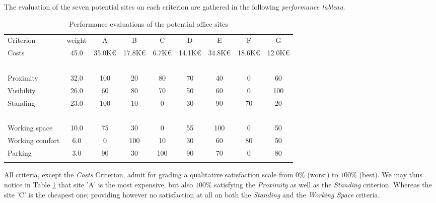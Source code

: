 The evaluation of the seven potential sites on each criterion are gathered in the following \emph{performance tableau}.
\begin{table}[h]
\caption{Performance evaluations of the potential office sites}
\label{tab:6.3}       %
\begin{center}
    \begin{tabular}{l|c|c|c|c|c|c|c|c}
      \svhline\noalign{\smallskip}
    Criterion  &   weight &  A  &      B &       C &       D &       E &        F &        G\\
       \noalign{\smallskip}\hline\noalign{\smallskip}

    Costs     &    45.0  &   35.0K€ &  17.8K€  & 6.7K€  &  14.1K€ &  34.8K€ &  18.6K€ &  12.0K€\\
    \      &        \    &   \      &  \     &   \     &   \    &    \    &    \    &    \ \\
    Proximity     &     32.0  &   100    &  20 &      80    &   70    &   40    &   0    &    60 \\
    Visibility     &     26.0  &   60     &  80  &     70    &   50    &   60    &   0    &    100 \\
    Standing     &     23.0  &   100   &   10   &    0     &   30    &   90    &   70   &    20 \\
    \        &      \    &   \     &   \    &    \     &   \     &   \     &   \    &    \  \\
    Working space     &     10.0  &   75    &   30   &    0     &   55    &   100   &   0    &    50  \\
    Working comfort     &      6.0  &   0     &   100  &    10    &   30    &   60    &   80   &    50 \\
    Parking     &      3.0  &   90    &   30   &    100   &   90    &   70    &   0    &    80 \\
      \noalign{\smallskip}\hline
    \end{tabular}
  \end{center}
\end{table}

All criteria, except the \emph{Costs} Criterion, admit for grading a qualitative satisfaction scale from $0\%$ (worst) to $100\%$ (best). We may thus notice in Table \ref{tab:6.3} that site 'A' is the most expensive, but also $100\%$ satisfying the \emph{Proximity} as well as the  \emph{Standing} criterion. Whereas the site 'C' is the cheapest one; providing however no satisfaction at all on both the \emph{Standing} and the \emph{Working Space} criteria.

